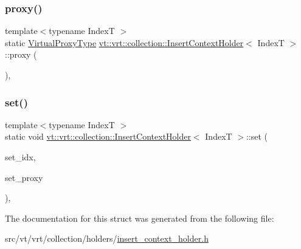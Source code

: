 \mbox{\label{structvt_1_1vrt_1_1collection_1_1_insert_context_holder_a29cfb4e5c041062dff15b25e198db1a3}} 
\subsubsection{\texorpdfstring{proxy()}{proxy()}}
{\footnotesize\ttfamily template$<$typename IndexT $>$ \\
static \hyperlink{namespacevt_a1b417dd5d684f045bb58a0ede70045ac}{Virtual\+Proxy\+Type} \hyperlink{structvt_1_1vrt_1_1collection_1_1_insert_context_holder}{vt\+::vrt\+::collection\+::\+Insert\+Context\+Holder}$<$ IndexT $>$\+::proxy (\begin{DoxyParamCaption}{ }\end{DoxyParamCaption})\hspace{0.3cm}{\ttfamily [inline]}, {\ttfamily [static]}}

\mbox{\label{structvt_1_1vrt_1_1collection_1_1_insert_context_holder_a6a045a1b570fcbabd30db317386a3a39}} 
\subsubsection{\texorpdfstring{set()}{set()}}
{\footnotesize\ttfamily template$<$typename IndexT $>$ \\
static void \hyperlink{structvt_1_1vrt_1_1collection_1_1_insert_context_holder}{vt\+::vrt\+::collection\+::\+Insert\+Context\+Holder}$<$ IndexT $>$\+::set (\begin{DoxyParamCaption}\item[{IndexT $\ast$const}]{set\+\_\+idx,  }\item[{\hyperlink{namespacevt_a1b417dd5d684f045bb58a0ede70045ac}{Virtual\+Proxy\+Type} const \&}]{set\+\_\+proxy }\end{DoxyParamCaption})\hspace{0.3cm}{\ttfamily [inline]}, {\ttfamily [static]}}



The documentation for this struct was generated from the following file\+:\begin{DoxyCompactItemize}
\item 
src/vt/vrt/collection/holders/\hyperlink{insert__context__holder_8h}{insert\+\_\+context\+\_\+holder.\+h}\end{DoxyCompactItemize}
